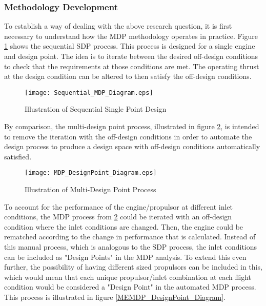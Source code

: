 			\vspace{1pt}
			\vspace{5mm}
			
		\subsubsection{Methodology Development}
			To establish a way of dealing with the above research question, it is first necessary to understand how the MDP methodology operates in practice.  Figure \ref{Sequential_MDP_Diagram} shows the sequential SDP process.  This process is designed for a single engine and design point.  The idea is to iterate between the desired off-design conditions to check that the requirements at those conditions are met.  The operating thrust at the design condition can be altered to then satisfy the off-design conditions.  
			
			\begin{figure}[htp]
				\centering
				\texttt{[image: Sequential\_MDP\_Diagram.eps]}
				\caption{Illustration of Sequential Single Point Design}
				\label{Sequential_MDP_Diagram}
			\end{figure}	 
			
			By comparison, the multi-design point process, illustrated in figure \ref{MDP_DesignPoint_Diagram}, is intended to remove the iteration with the off-design conditions in order to automate the design process to produce a design space with off-design conditions automatically satisfied. 
			
			\begin{figure}[htp]
				\centering
				\texttt{[image: MDP\_DesignPoint\_Diagram.eps]}
				\caption{Illustration of Multi-Design Point Process}
				\label{MDP_DesignPoint_Diagram}
			\end{figure}	 
			
			To account for the performance of the engine/propulsor at different inlet conditions, the MDP process from \ref{MDP_DesignPoint_Diagram} could be iterated with an off-design condition where the inlet conditions are changed.  Then, the engine could be rematched according to the change in performance that is calculated.  Instead of this manual process, which is analogous to the SDP process, the inlet conditions can be included as "Design Points" in the MDP analysis.  To extend this even further, the possibility of having different sized propulsors can be included in this, which would mean that each unique propulsor/inlet combination at each flight condition would be considered a "Design Point" in the automated MDP process.  This process is illustrated in figure \ref{MEMDP_DesignPoint_Diagram}.  
			
